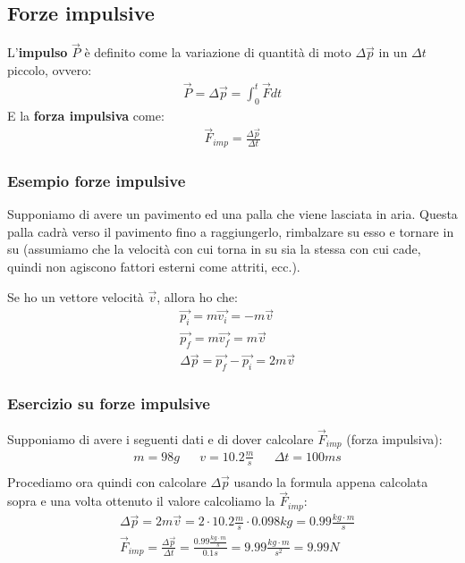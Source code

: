    \subsection{Forze impulsive}
        L'\textbf{impulso} $\vec{P}$ è definito come la variazione di quantità di moto $\Delta\vec{p}$ in un $\Delta t$ piccolo, ovvero:
        \begin{align*}
            \vec{P}=\Delta\vec{p}=\int_0^t{\vec{F}dt}
        \end{align*}
        E la \textbf{forza impulsiva} come:
        \begin{align*}
            \vec{F}_{imp}=\frac{\Delta\vec{p}}{\Delta t}
        \end{align*}

        \subsubsection{Esempio forze impulsive}
            Supponiamo di avere un pavimento ed una palla che viene lasciata in aria. Questa palla cadrà verso il pavimento fino a raggiungerlo, rimbalzare su esso e tornare in su (assumiamo che la velocità con cui torna in su sia la stessa con cui cade, quindi non agiscono fattori esterni come attriti, ecc.).


            Se ho un vettore velocità $\vec{v}$, allora ho che:
            \begin{align*}
                &\vec{p_i}=m\vec{v_i}=-m\vec{v}\\
                &\vec{p_f}=m\vec{v_f}=m\vec{v}\\
                &\Delta\vec{p}=\vec{p_f}-\vec{p_i}=2m\vec{v}
            \end{align*}

        \subsubsection{Esercizio su forze impulsive}
            Supponiamo di avere i seguenti dati e di dover calcolare $\vec{F}_{imp}$ (forza impulsiva):
            \begin{align*}
                &m=98g&&v=10.2\frac{m}{s}&&\Delta t=100ms\\
            \end{align*}
            Procediamo ora quindi con calcolare $\Delta\vec{p}$ usando la formula appena calcolata sopra e una volta ottenuto il valore calcoliamo la $\vec{F}_{imp}$:
            \begin{align*}
                &\Delta\vec{p}=2m\vec{v}=2\cdot 10.2\frac{m}{s}\cdot 0.098kg=0.99\frac{kg\cdot m}{s}\\
                &\vec{F}_{imp}=\frac{\Delta\vec{p}}{\Delta t}=\frac{0.99\frac{kg\cdot m}{s}}{0.1s}=9.99\frac{kg\cdot m}{s^2}=9.99N
            \end{align*}

